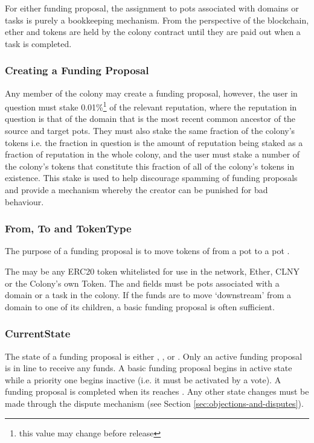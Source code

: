 For either funding proposal, the assignment to pots associated with domains or tasks is purely a bookkeeping mechanism. From the perspective of the blockchain, ether and tokens are held by the colony contract until they are paid out when a task is completed. 

\subsubsection*{Creating a Funding Proposal}
Any member of the colony may create a funding proposal, however, the user in question must stake 0.01\%\footnote{this value may change before release} of the relevant reputation, where the reputation in question is that of the domain that is the most recent common ancestor of the source and target pots. They must also stake the same fraction of the colony's tokens i.e. the fraction in question is the amount of reputation being staked as a fraction of reputation in the whole colony, and the user must stake a number of the colony's tokens that constitute this fraction of all of the colony's tokens in existence. This stake is used to help discourage spamming of funding proposals and provide a mechanism whereby the creator can be punished for bad behaviour. 

\subsubsection*{From, To and TokenType}
The purpose of a funding proposal is to move tokens of  from a pot  to a pot .

The  may be any ERC20 token whitelisted for use in the network, Ether, CLNY or the Colony's own Token. The  and  fields must be pots associated with a domain or a task in the colony. If the funds are to move `downstream' from a domain to one of its children, a basic funding proposal is often sufficient. 

\subsubsection*{CurrentState}
The state of a funding proposal is either , ,  or . Only an active funding proposal is in line to receive any funds. A basic funding proposal begins in active state while a priority one begins inactive (i.e. it must be activated by a vote). A funding proposal is completed when its  reaches . Any other state changes must be made through the dispute mechanism (see Section \ref{sec:objections-and-disputes}).

